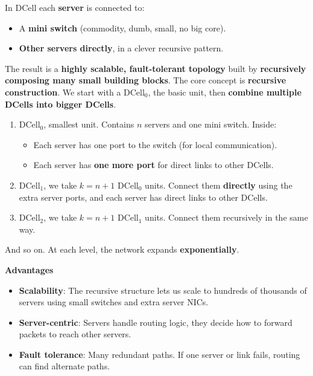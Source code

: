 \highspace
In DCell each \textbf{server} is connected to:
\begin{itemize}
    \item A \textbf{mini switch} (commodity, dumb, small, no big core).
    \item \textbf{Other servers directly}, in a clever recursive pattern.
\end{itemize}
The result is a \textbf{highly scalable, fault-tolerant topology} built by \textbf{recursively composing many small building blocks}. The core concept is \textbf{recursive construction}. We start with a $\text{DCell}_0$, the basic unit, then \textbf{combine multiple DCells into bigger DCells}.
\begin{enumerate}
    \item $\text{DCell}_0$, smallest unit. Contains $n$ servers and one mini switch. Inside:
    \begin{itemize}
        \item Each server has one port to the switch (for local communication).
        \item Each server has \textbf{one more port} for direct links to other DCells.
    \end{itemize}
    \item $\text{DCell}_1$, we take $k = n+1$ $\text{DCell}_0$ units. Connect them \textbf{directly} using the extra server ports, and each server has direct links to other DCells.
    \item $\text{DCell}_2$, we take $k = n + 1$ $\text{DCell}_1$ units. Connect them recursively in the same way.
\end{enumerate}
And so on. At each level, the network expands \textbf{exponentially}.

\highspace
\begin{flushleft}
    \textcolor{Green3}{ \textbf{Advantages}}
\end{flushleft}
\begin{itemize}
    \item \textbf{Scalability}: The recursive structure lets us scale to hundreds of thousands of servers using small switches and extra server NICs.
    \item \textbf{Server-centric}: Servers handle routing logic, they decide how to forward packets to reach other servers.
    \item \textbf{Fault tolerance}: Many redundant paths. If one server or link fails, routing can find alternate paths.
\end{itemize}

